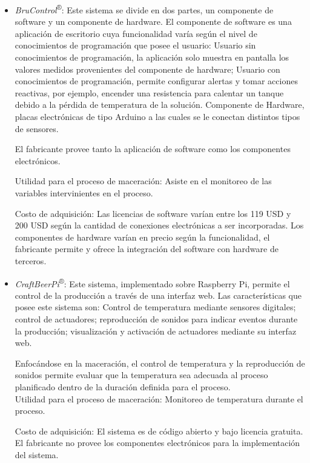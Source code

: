     \begin{itemize}
    
        \item \textit{BruControl}\textsuperscript{®}: Este sistema se divide en dos partes, un componente de software y un componente de hardware. El componente de software es una aplicación de escritorio cuya funcionalidad varía según el nivel de conocimientos de programación que posee el usuario: Usuario sin conocimientos de programación, la aplicación solo muestra en pantalla los valores medidos provenientes del componente de hardware; Usuario con conocimientos de programación, permite configurar alertas y tomar acciones reactivas, por ejemplo, encender una resistencia para calentar un tanque debido a la pérdida de temperatura de la solución. Componente de Hardware, placas electrónicas de tipo Arduino a las cuales se le conectan distintos tipos de sensores.
        \par
        El fabricante provee tanto la aplicación de software como los componentes electrónicos.
        \par
        Utilidad para el proceso de maceración: Asiste en el monitoreo de las variables intervinientes en el proceso.
        \par
        Costo de adquisición: Las licencias de software varían entre los 119 USD y 200 USD según la cantidad de conexiones electrónicas a ser incorporadas. Los componentes de hardware varían en precio según la funcionalidad, el fabricante permite y ofrece la integración del software con hardware de terceros.
        
        \item \textit{CraftBeerPi}\textsuperscript{®}: Este sistema, implementado sobre Raspberry Pi, permite el control de la producción a través de una interfaz web.
        Las características que posee este sistema son: Control de temperatura mediante sensores digitales; control de actuadores; reproducción de sonidos para indicar eventos durante la producción; visualización y activación de actuadores mediante su interfaz web.
        \par
        Enfocándose en la maceración, el control de temperatura y la reproducción de sonidos permite evaluar que la temperatura sea adecuada al proceso planificado dentro de la duración definida para el proceso.\\
        Utilidad para el proceso de maceración: Monitoreo de temperatura durante el proceso.
        \par
        Costo de adquisición: El sistema es de código abierto y bajo licencia gratuita. El fabricante no provee los componentes electrónicos para la implementación del sistema.
        
    \end{itemize}
    
